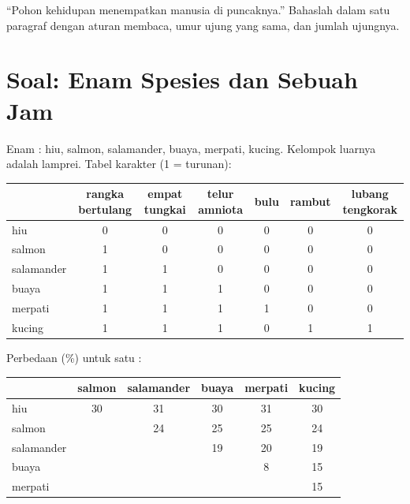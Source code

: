 \begin{exercise}[$\star\star\star$]\label{exo:g12:phylogenetic-trees:15}
``Pohon kehidupan menempatkan manusia di puncaknya.'' Bahaslah dalam
satu paragraf dengan aturan membaca, umur ujung yang sama, dan jumlah
ujungnya.
\end{exercise}

\section{Soal: Enam Spesies dan Sebuah Jam}

\begin{problem}
\label{pb:g12:phylogenetic-trees:1}
Enam : hiu, salmon, salamander, buaya, merpati, kucing.
Kelompok luarnya adalah lamprei. Tabel karakter (1 = turunan):

\begin{center}
\small
\setlength{\tabcolsep}{4pt}
\begin{tabular}{lcccccc}
 & rangka bertulang & empat tungkai & telur amniota & bulu & rambut & lubang tengkorak \\ \hline
hiu & 0 & 0 & 0 & 0 & 0 & 0 \\
salmon & 1 & 0 & 0 & 0 & 0 & 0 \\
salamander & 1 & 1 & 0 & 0 & 0 & 0 \\
buaya & 1 & 1 & 1 & 0 & 0 & 0 \\
merpati & 1 & 1 & 1 & 1 & 0 & 0 \\
kucing & 1 & 1 & 1 & 0 & 1 & 1 \\
\end{tabular}
\end{center}

Perbedaan  (\%) untuk satu :

\begin{center}
\begin{tabular}{lccccc}
 & salmon & salamander & buaya & merpati & kucing \\ \hline
hiu & 30 & 31 & 30 & 31 & 30 \\
salmon & & 24 & 25 & 25 & 24 \\
salamander & & & 19 & 20 & 19 \\
buaya & & & & 8 & 15 \\
merpati & & & & & 15 \\
\end{tabular}
\end{center}


\end{problem}
